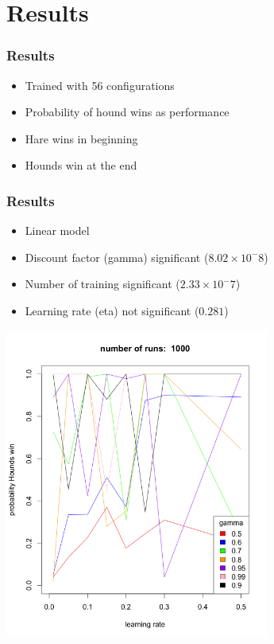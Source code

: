 \documentclass{beamer}
\begin{document}
\section{Results}
\begin{frame}
    \frametitle{Results}
    \begin{itemize}
        \item Trained with 56 configurations
        \item Probability of hound wins as performance

            \phantom{M}

        \item Hare wins in beginning
        \item Hounds win at the end
    \end{itemize}
\end{frame}

\begin{frame}
    \frametitle{Results}
    \begin{itemize}[<+->]
        \item Linear model
        \item Discount factor (gamma) significant ($8.02 \times 10^-8$)
        \item Number of training significant ($2.33 \times 10^-7$)
        \item Learning rate (eta) not significant ($0.281$)
    \end{itemize}
\end{frame}

\begin{frame}
    \centering
    \includegraphics[width=0.65\textwidth]{r1000.png}
\end{frame}
\end{document}
